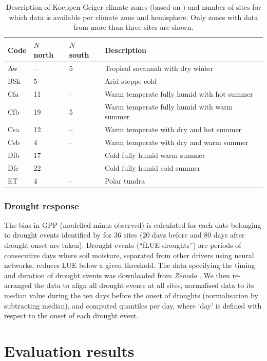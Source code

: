 \documentclass{myreport}
\begin{document}
\begin{table}
\caption{Description of Koeppen-Geiger climate zones (based on \citet{falge17}) and number of sites for which data is available per climate zone and hemisphere. Only zones with data from more than three sites are shown.} 
\centering
\begin{tabular}{llll}
  \toprule
  Code & $N$ north & $N$ south & Description \\ 
  \midrule
   Aw   & -- & 5 &  Tropical savannah with dry winter \\ 
   BSk  & 5 & -- & Arid steppe cold \\ 
   Cfa  & 11 & -- & Warm temperate fully humid with hot summer \\ 
   Cfb  & 19 & 5 & Warm temperate fully humid with warm summer \\ 
   Csa  & 12 & -- & Warm temperate with dry and hot summer \\ 
   Csb  & 4 & -- & Warm temperate with dry and warm summer \\ 
   Dfb  & 17 & -- & Cold fully humid warm summer \\ 
   Dfc  & 22 & -- & Cold fully humid cold summer \\ 
   ET   & 4 & -- & Polar tundra \\ 
   \bottomrule
  \end{tabular}
  \label{tab:kgclimate}
\end{table}


\subsubsection{Drought response}
\label{sec:droughtresponse}
The bias in GPP (modelled minus observed) is calculated for each date belonging to drought events identified by \citet{stocker18newphyt} for 36 sites (20 days before and 80 days after drought onset are taken). Drought events (``fLUE droughts'') are periods of consecutive days where soil moisture, separated from other drivers using neural networks, reduces LUE below a given threshold. The data specifying the timing and duration of drought events was downloaded from \textit{Zenodo} \citep{flue}. We then re-arranged the data to align all drought events at all sites, normalised data to its median value during the ten days before the onset of droughts (normalisation by subtracting median), and computed quantiles per day, where `day' is defined with respect to the onset of each drought event.

\section{Evaluation results}
\label{sec:results}
\end{document}
